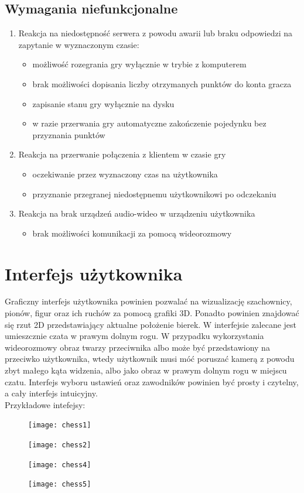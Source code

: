 \documentclass[12pt]{article}
\begin{document}
\subsection{Wymagania niefunkcjonalne}
\begin{enumerate}
\item Reakcja na niedostępność serwera z powodu awarii lub braku odpowiedzi na zapytanie w wyznaczonym czasie:
\begin{itemize}
\item możliwość rozegrania gry wyłącznie w trybie z komputerem
\item brak możliwości dopisania liczby otrzymanych punktów do konta gracza
\item zapisanie stanu gry wyłącznie na dysku
\item w razie przerwania gry automatyczne zakończenie pojedynku bez przyznania punktów 
\end{itemize}

\item Reakcja na przerwanie połączenia z klientem w czasie gry
\begin{itemize}
\item oczekiwanie przez wyznaczony czas na użytkownika
\item przyznanie przegranej niedostępnemu użytkownikowi po odczekaniu
\end{itemize}

\item Reakcja na brak urządzeń audio-wideo w urządzeniu użytkownika
\begin{itemize}
\item brak możliwości komunikacji za pomocą wideorozmowy
\end{itemize}
\end{enumerate}

\section{Interfejs użytkownika}
Graficzny interfejs użytkownika powinien pozwalać na wizualizację szachownicy, pionów, figur oraz ich ruchów za pomocą grafiki 3D. Ponadto  powinien znajdować się rzut 2D przedstawiający aktualne położenie bierek. W interfejsie zalecane jest umieszcznie czata w prawym dolnym rogu. W przypadku wykorzystania wideorozmowy obraz twarzy przeciwnika albo może być przedstawiony na przeciwko użytkownika, wtedy użytkownik musi móć poruszać kamerą z powodu zbyt małego kąta widzenia, albo jako obraz w prawym dolnym rogu w miejscu czatu. Interfejs wyboru ustawień oraz zawodników powinien być prosty i czytelny, a cały interfejs intuicyjny. \\ \linebreak Przykładowe intefejsy:
\begin{figure}[!ht]
  \centering
	\texttt{[image: chess1]}
\end{figure}


\begin{figure}[!ht]
  \centering
	\texttt{[image: chess2]}
\end{figure}

\begin{figure}[!ht]
  \centering
	\texttt{[image: chess4]}
\end{figure}

\begin{figure}[!ht]
  \centering
	\texttt{[image: chess5]}
\end{figure}
\end{document}
